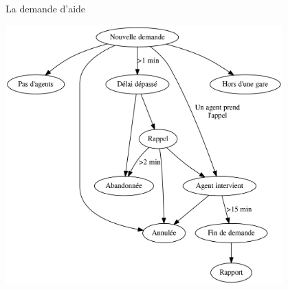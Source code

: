 \documentclass{beamer}
\begin{document}
\begin{frame}{La demande d'aide}
    \begin{centering}
        \includegraphics[width=0.8\textwidth]{requete.png}
    \end{centering}
\end{frame}
 
\end{document}
